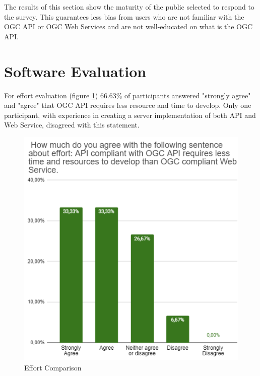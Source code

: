 The results of this section show the maturity of the public selected to respond to the survey. This guarantees less bias from users who are not familiar with the OGC API or OGC Web Services and are not well-educated on what is the OGC API.

\section{Software Evaluation}

For effort evaluation (figure \ref{fig:effort}) 66.63\% of participants answered "strongly agree" and "agree" that OGC API requires less resource and time to develop. Only one participant, with experience in creating a server implementation of both API and Web Service, disagreed with this statement.

\begin{figure}[H]
     \centering
     \includegraphics[scale=0.9]{img/effort.png}
     \caption{Effort Comparison}
     \label{fig:effort}
\end{figure}


